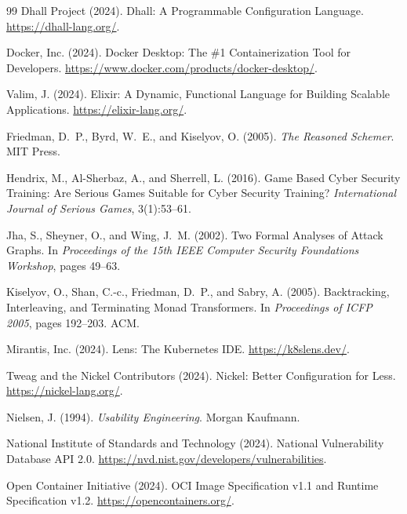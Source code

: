 \documentclass[11pt,twocolumn]{article}
\begin{document}
\begin{thebibliography}{99}
Dhall Project (2024).
\newblock Dhall: A Programmable Configuration Language.
\newblock \url{https://dhall-lang.org/}.

Docker, Inc. (2024).
\newblock Docker Desktop: The \#1 Containerization Tool for Developers.
\newblock \url{https://www.docker.com/products/docker-desktop/}.

Valim, J. (2024).
\newblock Elixir: A Dynamic, Functional Language for Building Scalable
Applications.
\newblock \url{https://elixir-lang.org/}.

Friedman, D.~P., Byrd, W.~E., and Kiselyov, O. (2005).
\newblock \emph{The Reasoned Schemer}.
\newblock MIT Press.

Hendrix, M., Al-Sherbaz, A., and Sherrell, L. (2016).
\newblock Game Based Cyber Security Training: Are Serious Games
Suitable for Cyber Security Training?
\newblock \emph{International Journal of Serious Games}, 3(1):53--61.

Jha, S., Sheyner, O., and Wing, J.~M. (2002).
\newblock Two Formal Analyses of Attack Graphs.
\newblock In \emph{Proceedings of the 15th IEEE Computer Security
Foundations Workshop}, pages 49--63.

Kiselyov, O., Shan, C.-c., Friedman, D.~P., and Sabry, A. (2005).
\newblock Backtracking, Interleaving, and Terminating Monad
Transformers.
\newblock In \emph{Proceedings of ICFP 2005}, pages 192--203. ACM.

Mirantis, Inc. (2024).
\newblock Lens: The Kubernetes IDE.
\newblock \url{https://k8slens.dev/}.

Tweag and the Nickel Contributors (2024).
\newblock Nickel: Better Configuration for Less.
\newblock \url{https://nickel-lang.org/}.

Nielsen, J. (1994).
\newblock \emph{Usability Engineering}.
\newblock Morgan Kaufmann.

National Institute of Standards and Technology (2024).
\newblock National Vulnerability Database API 2.0.
\newblock \url{https://nvd.nist.gov/developers/vulnerabilities}.

Open Container Initiative (2024).
\newblock OCI Image Specification v1.1 and Runtime Specification v1.2.
\newblock \url{https://opencontainers.org/}.


\end{thebibliography}
\end{document}
